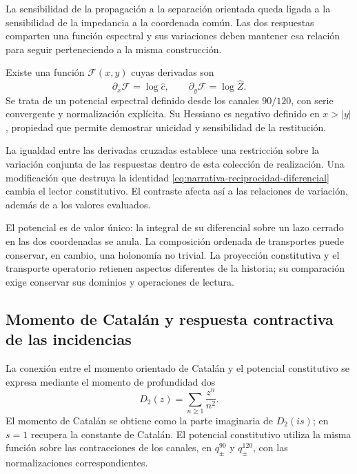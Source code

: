 La sensibilidad de la propagación a la separación orientada queda
ligada a la sensibilidad de la impedancia a la coordenada común.
Las dos respuestas comparten una función espectral y sus variaciones
deben mantener esa relación para seguir perteneciendo a la misma
construcción.

Existe una función $\mathscr F(x,y)$ cuyas derivadas son
\begin{equation}
 \partial_x\mathscr F=\log\widehat c,
 \qquad
 \partial_y\mathscr F=\log\widehat Z.
 \label{eq:narrativa-gradiente-potencial}
\end{equation}
Se trata de un potencial espectral definido desde los canales $90/120$,
con serie convergente y normalización explícita. Su Hessiano es
negativo definido en $x>|y|$, propiedad que permite demostrar
unicidad y sensibilidad de la restitución.

La igualdad entre las derivadas cruzadas establece una restricción
sobre la variación conjunta de las respuestas dentro de esta colección
de realización. Una modificación que destruya la identidad
\eqref{eq:narrativa-reciprocidad-diferencial} cambia el lector
constitutivo. El contraste afecta así a las relaciones de variación,
además de a los valores evaluados.

El potencial es de valor único: la integral de su diferencial sobre
un lazo cerrado en las dos coordenadas se anula. La composición
ordenada de transportes puede conservar, en cambio, una holonomía
no trivial. La proyección constitutiva y el transporte operatorio
retienen aspectos diferentes de la historia; su comparación exige
conservar sus dominios y operaciones de lectura.

\subsection{Momento de Catalán y respuesta contractiva de las incidencias}
\label{subsec:narrativa-catalan-potencial}

La conexión entre el momento orientado de Catalán y el potencial
constitutivo se expresa mediante el momento de profundidad dos
\begin{equation}
 D_2(z)=\sum_{n\geq1}\frac{z^n}{n^2}.
 \label{eq:narrativa-momento-dos}
\end{equation}
El momento de Catalán se obtiene como la parte imaginaria de
$D_2(is)$; en $s=1$ recupera la constante de Catalán. El potencial
constitutivo utiliza la misma función sobre las contracciones de
los canales, en $q_\pm^{90}$ y $q_\pm^{120}$, con las normalizaciones
correspondientes.

